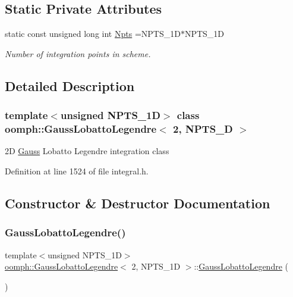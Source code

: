 \subsection*{Static Private Attributes}
\begin{DoxyCompactItemize}
\item 
static const unsigned long int \hyperlink{classoomph_1_1GaussLobattoLegendre_3_012_00_01NPTS__1D_01_4_ad7b67b90f29484aff0f1567467aaf9bc}{Npts} =N\+P\+T\+S\+\_\+1D$\ast$N\+P\+T\+S\+\_\+1D
\begin{DoxyCompactList}\small\item\em Number of integration points in scheme. \end{DoxyCompactList}\end{DoxyCompactItemize}


\subsection{Detailed Description}
\subsubsection*{template$<$unsigned N\+P\+T\+S\+\_\+1D$>$\newline
class oomph\+::\+Gauss\+Lobatto\+Legendre$<$ 2, N\+P\+T\+S\+\_\+D $>$}

2D \hyperlink{classoomph_1_1Gauss}{Gauss} Lobatto Legendre integration class 

Definition at line 1524 of file integral.\+h.



\subsection{Constructor \& Destructor Documentation}
\mbox{\label{classoomph_1_1GaussLobattoLegendre_3_012_00_01NPTS__1D_01_4_a0dee3143e486b59326d774682332812f}} 
\subsubsection{\texorpdfstring{Gauss\+Lobatto\+Legendre()}{GaussLobattoLegendre()}}
{\footnotesize\ttfamily template$<$unsigned N\+P\+T\+S\+\_\+1D$>$ \\
\hyperlink{classoomph_1_1GaussLobattoLegendre}{oomph\+::\+Gauss\+Lobatto\+Legendre}$<$ 2, N\+P\+T\+S\+\_\+1D $>$\+::\hyperlink{classoomph_1_1GaussLobattoLegendre}{Gauss\+Lobatto\+Legendre} (\begin{DoxyParamCaption}{ }\end{DoxyParamCaption})}



